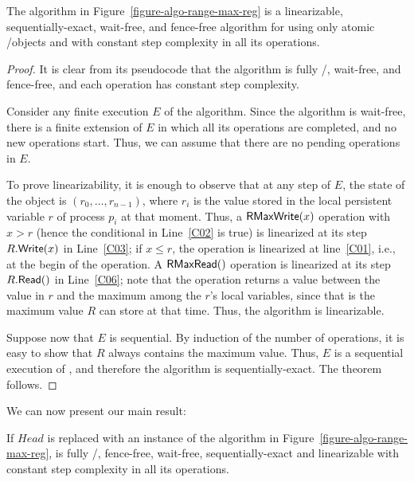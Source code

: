 \begin{theorem}\label{theo-range-max-reg}
The algorithm in Figure~\ref{figure-algo-range-max-reg} is a linearizable, sequentially-exact, wait-free, and fence-free algorithm for \RangeMaxReg using only atomic \R/\W objects and with constant step complexity in all its operations.
\end{theorem}

\begin{proof}
It is clear from its pseudocode that the algorithm is fully \R/\W, wait-free, and fence-free, and each operation has constant step complexity.

Consider any finite execution \(E\) of the algorithm.  Since the algorithm is wait-free, there is a finite extension of \(E\) in which all its operations are completed, and no new operations start. Thus, we can assume that there are no pending operations in \(E\).

To prove linearizability, it is enough to observe that at any step of \(E\), the state of the object is \((r_0, \hdots, r_{n-1})\), where \(r_i\) is the value stored in the local persistent variable \(r\) of process \(p_i\) at that moment.  Thus, a \({\sf \small RMaxWrite}(x)\) operation with \(x > r\) (hence the conditional in Line~\ref{C02} is {\sf true}) is linearized at its step \(R.{\sf \small Write}(x)\) in Line~\ref{C03}; if \(x \leq r\), the operation is linearized at line~\ref{C01}, i.e., at the begin of the operation.  A \({\sf \small RMaxRead}()\) operation is linearized at its step \(R.{\sf \small Read}()\) in Line~\ref{C06}; note that the operation returns a value between the value in \(r\) and the maximum among the \(r\)'s local variables, since that is the maximum value \(R\) can store at that time. Thus, the algorithm is linearizable.

Suppose now that \(E\) is sequential. By induction of the number of operations, it is easy to show that \(R\) always contains the maximum value.  Thus, \(E\) is a sequential execution of \MaxReg, and therefore the algorithm is sequentially-exact. The theorem follows.
\end{proof}

We can now present our main result:

\begin{theorem}\label{theo-wf-fully}
If \(Head\) is replaced with an instance of the algorithm in Figure~\ref{figure-algo-range-max-reg}, \NCWSM is fully \R/\W, fence-free, wait-free, sequentially-exact and linearizable with constant step complexity in all its operations.
\end{theorem}

